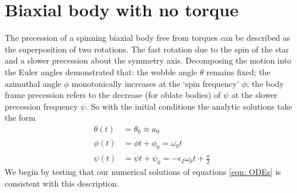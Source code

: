 \documentclass[/home/greg/Thesis/main/main.tex]{subfiles}
\begin{document}
\section{Biaxial body with no torque}
\label{sec: Biaxial body with no torque}

The precession of a spinning biaxial body free from torques can be described as
the superposition of two rotations.  The fast rotation due to the spin of the
star and a slower precession about the symmetry axis. Decomposing the motion
into the Euler angles \citet{Jones2001} demonstrated that: the wobble angle
$\theta$ remains fixed; the azimuthal angle $\phi$ monotonically increases at
the `spin frequency' $\dot{\phi}$; the body frame precession refers to the
decrease (for oblate bodies) of $\psi$ at the slower precession frequency
$\dot{\psi}$. So with the initial conditions the analytic solutions take
the form
\begin{align}
    \theta(t) & = \theta_{0} \approx a_{0} \\
    \phi(t) & = \dot{\phi}t + \phi_{0} = \omega_{0} t \\
    \psi(t) & = \dot{\psi}t + \psi_{0}= -\epsilon_{I}\omega_{0}t+\frac{\pi}{2} 
    \label{eqn: euler angles torque free evolution}
\end{align}
We begin by testing that our numerical solutions of equations
\eqref{eqn: ODEs} is consistent with this description.

\end{document}
